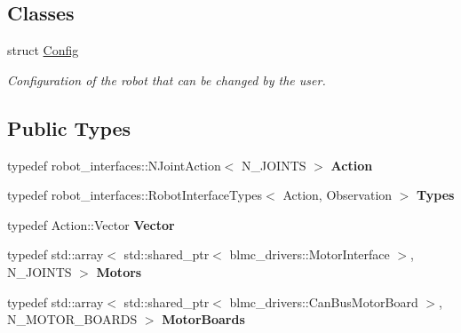 \subsection*{Classes}
\begin{DoxyCompactItemize}
\item 
struct \hyperlink{structblmc__robots_1_1NJointBlmcRobotDriver_1_1Config}{Config}
\begin{DoxyCompactList}\small\item\em Configuration of the robot that can be changed by the user. \end{DoxyCompactList}\end{DoxyCompactItemize}
\subsection*{Public Types}
\begin{DoxyCompactItemize}
\item 
\mbox{\label{classblmc__robots_1_1NJointBlmcRobotDriver_a6c04fde05f933db1703457f94c6cef6b}} 
typedef robot\+\_\+interfaces\+::\+N\+Joint\+Action$<$ N\+\_\+\+J\+O\+I\+N\+TS $>$ {\bfseries Action}
\item 
\mbox{\label{classblmc__robots_1_1NJointBlmcRobotDriver_a4827e39990852c1743ce095a74213ac0}} 
typedef robot\+\_\+interfaces\+::\+Robot\+Interface\+Types$<$ Action, Observation $>$ {\bfseries Types}
\item 
\mbox{\label{classblmc__robots_1_1NJointBlmcRobotDriver_acdeabef6dc3a084af61da9eda3555083}} 
typedef Action\+::\+Vector {\bfseries Vector}
\item 
\mbox{\label{classblmc__robots_1_1NJointBlmcRobotDriver_a38bce1426a7ad5418dff1d43d0fc338e}} 
typedef std\+::array$<$ std\+::shared\+\_\+ptr$<$ blmc\+\_\+drivers\+::\+Motor\+Interface $>$, N\+\_\+\+J\+O\+I\+N\+TS $>$ {\bfseries Motors}
\item 
\mbox{\label{classblmc__robots_1_1NJointBlmcRobotDriver_ab703f92d3c01fbd3d481f886bfb81eca}} 
typedef std\+::array$<$ std\+::shared\+\_\+ptr$<$ blmc\+\_\+drivers\+::\+Can\+Bus\+Motor\+Board $>$, N\+\_\+\+M\+O\+T\+O\+R\+\_\+\+B\+O\+A\+R\+DS $>$ {\bfseries Motor\+Boards}
\end{DoxyCompactItemize}
